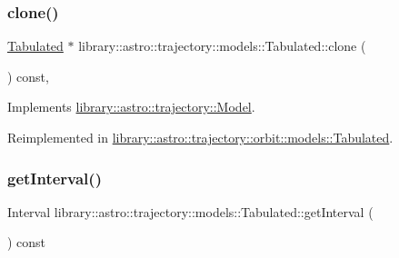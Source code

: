 \mbox{\label{classlibrary_1_1astro_1_1trajectory_1_1models_1_1_tabulated_a192cfb0ceb4a11d02578adc9702cabc1}} 
\subsubsection{\texorpdfstring{clone()}{clone()}}
{\footnotesize\ttfamily \hyperlink{classlibrary_1_1astro_1_1trajectory_1_1models_1_1_tabulated}{Tabulated} $\ast$ library\+::astro\+::trajectory\+::models\+::\+Tabulated\+::clone (\begin{DoxyParamCaption}{ }\end{DoxyParamCaption}) const\hspace{0.3cm}{\ttfamily [override]}, {\ttfamily [virtual]}}



Implements \hyperlink{classlibrary_1_1astro_1_1trajectory_1_1_model_ad6181e14aea57534897e7446a2a27578}{library\+::astro\+::trajectory\+::\+Model}.



Reimplemented in \hyperlink{classlibrary_1_1astro_1_1trajectory_1_1orbit_1_1models_1_1_tabulated_a8ccec23a49086c6c3fbda2cc81e7a4dc}{library\+::astro\+::trajectory\+::orbit\+::models\+::\+Tabulated}.

\mbox{\label{classlibrary_1_1astro_1_1trajectory_1_1models_1_1_tabulated_a8c0710d386728b7443469a49c5571e18}} 
\subsubsection{\texorpdfstring{get\+Interval()}{getInterval()}}
{\footnotesize\ttfamily Interval library\+::astro\+::trajectory\+::models\+::\+Tabulated\+::get\+Interval (\begin{DoxyParamCaption}{ }\end{DoxyParamCaption}) const}

